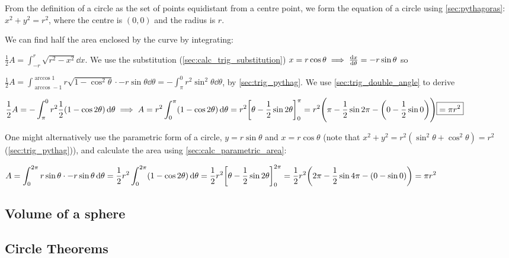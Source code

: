 \documentclass[a4paper,11pt]{article}
\begin{document}

    From the definition of a circle as the set of points equidistant from a
    centre point, we form the equation of a circle using \ref{sec:pythagoras}:
    $x^2 + y^2 = r^2$, where the centre is $(0, 0)$ and the radius is $r$.

    We can find half the area enclosed by the curve by integrating:

    $\displaystyle \frac 12 A = \int_{-r}^r \sqrt{r^2 - x^2} \dd{x}$. We use the
    substitution (\ref{sec:calc_trig_substitution})
    $x = r \cos \theta \implies \dv{x}{\theta} = -r \sin \theta$ so

    $\displaystyle \frac 12 A = \int_{\arccos -1}^{\arccos 1}
        r\sqrt{1 - \cos^2 \theta} \cdot -r \sin \theta \dd{\theta}
      = -\int_\pi^0 r^2 \sin^2 \theta \dd{\theta}$, by \ref{sec:trig_pythag}. We
      use \ref{sec:trig_double_angle} to derive

    $\displaystyle \frac 12 A = -\int_\pi^0
        r^2 \frac 12 (1 - \cos 2 \theta) \dd{\theta} \implies
     A = r^2 \int_0^\pi (1 - \cos 2 \theta) \dd{\theta} =
     r^2\bqty{\theta - \frac 12 \sin 2 \theta}_0^\pi
     \\= r^2 \pqty{\pi - \frac 12 \sin 2 \pi -
                   \pqty{0 - \frac 12 \sin 0}} \boxed{= \pi r^2}$

    One might alternatively use the parametric form of a circle,
    $y = r \sin \theta$ and $x = r \cos \theta$
    (note that $x^2 + y^2 = r^2(\sin^2 \theta + \cos^2 \theta) = r^2$
    (\ref{sec:trig_pythag})), and calculate the area using
    \ref{sec:calc_parametric_area}:

    $\displaystyle A = \int_0^{2\pi}
        r \sin \theta \cdot -r \sin \theta \dd{\theta} =
     \frac 12 r^2 \int_0^{2\pi} (1 - \cos 2 \theta) \dd{\theta} =
     \frac 12 r^2 \bqty{\theta - \frac 12 \sin 2 \theta}_0^{2\pi}
     \\= \frac 12 r^2 \pqty{2\pi - \frac 12 \sin 4 \pi -
                      \pqty{0 - \sin 0}} = \pi r^2$

    \subsection{Volume of a sphere}

    \subsection{Circle Theorems}
\end{document}
